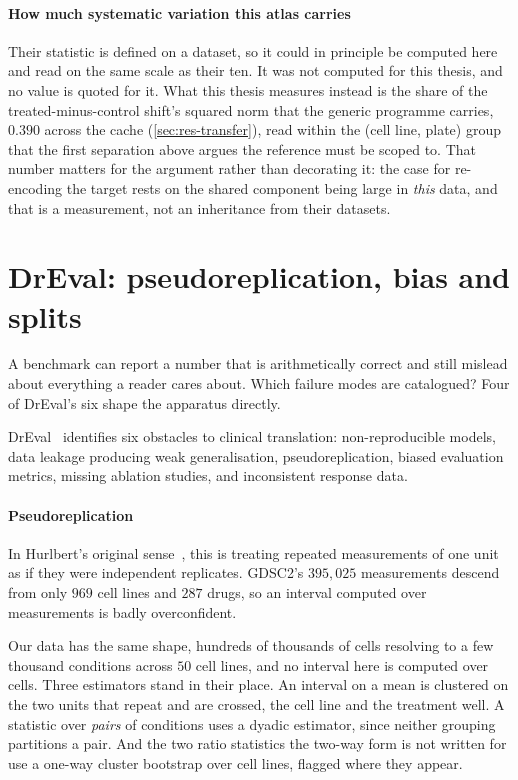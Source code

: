 \paragraph{How much systematic variation this atlas carries}
Their statistic is defined on a dataset, so it could in principle be computed
here and read on the same scale as their ten. It was not computed for this
thesis, and no value is quoted for it. What this thesis measures instead is the
share of the treated-minus-control shift's squared norm that the generic
programme carries, $0.390$ across the cache (\cref{sec:res-transfer}), read
within the (cell line, plate) group that the first separation above argues the
reference must be scoped to. That number matters for the argument rather than
decorating it: the case for re-encoding the target rests on the shared component
being large in \emph{this} data, and that is a measurement, not an inheritance
from their datasets.

\section{DrEval: pseudoreplication, bias and splits}
\label{sec:lit-dreval}
\framedecl{-}

\begin{question}
A benchmark can report a number that is arithmetically correct and still mislead
about everything a reader cares about. Which failure modes are catalogued? Four
of DrEval's six shape the apparatus directly.
\end{question}

\noindent
DrEval~\cite{dreval} identifies six obstacles to clinical translation:
non-reproducible models, data leakage producing weak generalisation,
pseudoreplication, biased evaluation metrics, missing ablation studies, and
inconsistent response data.

\paragraph{Pseudoreplication} In Hurlbert's original sense~\cite{hurlbert}, this
is treating repeated measurements of one unit as if they were independent
replicates. GDSC2's $395{,}025$ measurements descend from only $969$ cell lines
and $287$ drugs, so an interval computed over measurements is badly
overconfident.

Our data has the same shape, hundreds of thousands of cells resolving to a few
thousand conditions across $50$ cell lines, and no interval here is computed over
cells. Three estimators stand in their place. An interval on a mean is clustered
on the two units that repeat and are crossed, the cell line and the treatment
well. A statistic over \emph{pairs} of conditions uses a dyadic estimator, since
neither grouping partitions a pair. And the two ratio statistics the two-way form
is not written for use a one-way cluster bootstrap over cell lines, flagged where
they appear.

